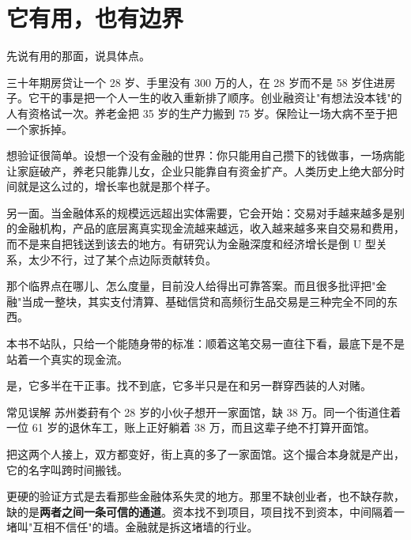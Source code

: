 \section{它有用，也有边界}

先说有用的那面，说具体点。

三十年期房贷让一个 28 岁、手里没有 300 万的人，在 28 岁而不是 58 岁住进房子。它干的事是把一个人一生的收入重新排了顺序。创业融资让"有想法没本钱"的人有资格试一次。养老金把 35 岁的生产力搬到 75 岁。保险让一场大病不至于把一个家拆掉。

想验证很简单。设想一个没有金融的世界：你只能用自己攒下的钱做事，一场病能让家庭破产，养老只能靠儿女，企业只能靠自有资金扩产。人类历史上绝大部分时间就是这么过的，增长率也就是那个样子。

另一面。当金融体系的规模远远超出实体需要，它会开始：交易对手越来越多是别的金融机构，产品的底层离真实现金流越来越远，收入越来越多来自交易和费用，而不是来自把钱送到该去的地方。有研究认为金融深度和经济增长是倒 U 型关系，太少不行，过了某个点边际贡献转负。

那个临界点在哪儿、怎么度量，目前没人给得出可靠答案。而且很多批评把"金融"当成一整块，其实支付清算、基础信贷和高频衍生品交易是三种完全不同的东西。

本书不站队，只给一个能随身带的标准：顺着这笔交易一直往下看，最底下是不是站着一个真实的现金流。

是，它多半在干正事。找不到底，它多半只是在和另一群穿西装的人对赌。

\begin{mythbox}{常见误解}
苏州娄葑有个 28 岁的小伙子想开一家面馆，缺 38 万。同一个街道住着一位 61 岁的退休车工，账上正好躺着 38 万，而且这辈子绝不打算开面馆。

把这两个人接上，双方都变好，街上真的多了一家面馆。这个撮合本身就是产出，它的名字叫跨时间搬钱。

更硬的验证方式是去看那些金融体系失灵的地方。那里不缺创业者，也不缺存款，缺的是\textbf{两者之间一条可信的通道}。资本找不到项目，项目找不到资本，中间隔着一堵叫"互相不信任"的墙。金融就是拆这堵墙的行业。

\end{mythbox}


